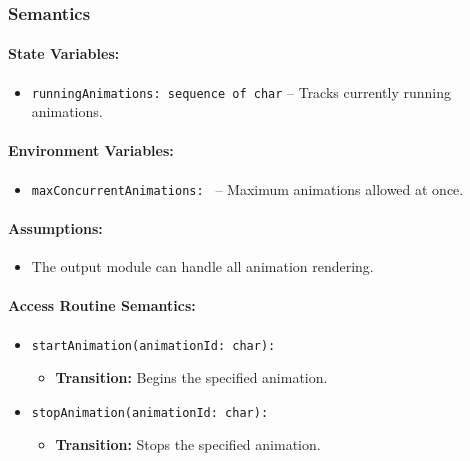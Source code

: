 \documentclass[12pt, titlepage]{article}
\begin{document}
\subsubsection{Semantics}

\paragraph{State Variables:}
\begin{itemize}
    \item \texttt{runningAnimations: sequence of char} -- Tracks currently running animations.
\end{itemize}

\paragraph{Environment Variables:}
\begin{itemize}
    \item \texttt{maxConcurrentAnimations: } -- Maximum animations allowed at once.
\end{itemize}

\paragraph{Assumptions:}
\begin{itemize}
    \item The output module can handle all animation rendering.
\end{itemize}

\paragraph{Access Routine Semantics:}
\begin{itemize}
    \item \texttt{startAnimation(animationId: char):}
    \begin{itemize}
        \item \textbf{Transition:} Begins the specified animation.
    \end{itemize}
    \item \texttt{stopAnimation(animationId: char):}
    \begin{itemize}
        \item \textbf{Transition:} Stops the specified animation.
    \end{itemize}
\end{itemize}
\end{document}

